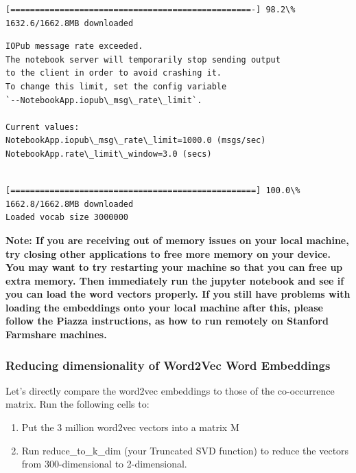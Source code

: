 \documentclass[11pt]{article}
\providecommand{\tightlist}{%
      \setlength{\itemsep}{0pt}\setlength{\parskip}{0pt}}
\begin{document}
    \begin{Verbatim}[commandchars=\\\{\}]
[=================================================-] 98.2\% 1632.6/1662.8MB downloaded
    \end{Verbatim}

    \begin{Verbatim}[commandchars=\\\{\}]
IOPub message rate exceeded.
The notebook server will temporarily stop sending output
to the client in order to avoid crashing it.
To change this limit, set the config variable
`--NotebookApp.iopub\_msg\_rate\_limit`.

Current values:
NotebookApp.iopub\_msg\_rate\_limit=1000.0 (msgs/sec)
NotebookApp.rate\_limit\_window=3.0 (secs)


    \end{Verbatim}

    \begin{Verbatim}[commandchars=\\\{\}]
[==================================================] 100.0\% 1662.8/1662.8MB downloaded
Loaded vocab size 3000000

    \end{Verbatim}

    \textbf{Note: If you are receiving out of memory issues on your local
machine, try closing other applications to free more memory on your
device. You may want to try restarting your machine so that you can free
up extra memory. Then immediately run the jupyter notebook and see if
you can load the word vectors properly. If you still have problems with
loading the embeddings onto your local machine after this, please follow
the Piazza instructions, as how to run remotely on Stanford Farmshare
machines.}

    \subsubsection{Reducing dimensionality of Word2Vec Word
Embeddings}\label{reducing-dimensionality-of-word2vec-word-embeddings}

Let's directly compare the word2vec embeddings to those of the
co-occurrence matrix. Run the following cells to:

\begin{enumerate}
\def\labelenumi{\arabic{enumi}.}
\tightlist
\item
  Put the 3 million word2vec vectors into a matrix M
\item
  Run reduce\_to\_k\_dim (your Truncated SVD function) to reduce the
  vectors from 300-dimensional to 2-dimensional.
\end{enumerate}
\end{document}
